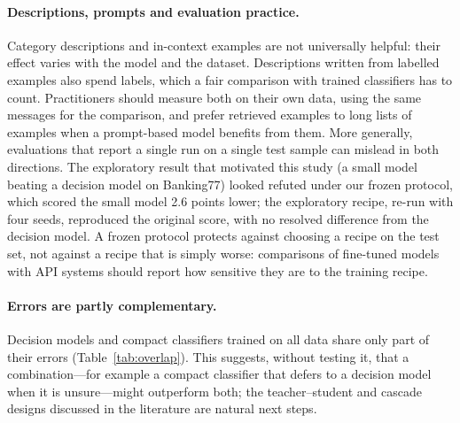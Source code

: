 \paragraph{Descriptions, prompts and evaluation practice.} Category descriptions and in-context examples are not universally helpful:
their effect varies with the model and the dataset. Descriptions written from labelled examples also spend labels, which a fair
comparison with trained classifiers has to count. Practitioners should measure both on their own data, using the same messages for the comparison, and
prefer retrieved examples to long lists of examples when a prompt-based model benefits from them. More generally, evaluations that report
a single run on a single test sample can mislead in both directions. The exploratory result that motivated this study (a small model
beating a decision model on Banking77) looked refuted under our frozen protocol, which scored the small model 2.6 points lower; the
exploratory recipe, re-run with four seeds, reproduced the original score, with no resolved difference from the decision model. A frozen protocol protects
against choosing a recipe on the test set, not against a recipe that is simply worse: comparisons of fine-tuned models with API systems
should report how sensitive they are to the training recipe.

\paragraph{Errors are partly complementary.} Decision models and compact classifiers trained on all data share only part of their errors
(Table~\ref{tab:overlap}). This suggests, without testing it, that a combination---for example a compact classifier that defers to a decision
model when it is unsure---might outperform both; the teacher--student and cascade designs discussed in the literature are natural next steps.
